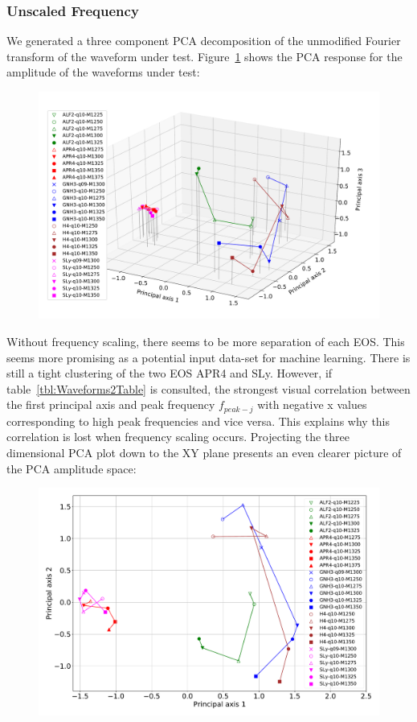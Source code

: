 \subsubsection{Unscaled Frequency}
\label{sec:PCAUnscaled}
We generated a three component PCA decomposition of the unmodified Fourier transform of the waveform under test. Figure~\ref{fig:PCAUnscaled3Damp} shows the PCA response for the amplitude of the waveforms under test: 
\begin{figure}[H]
	\centering
	\includegraphics[width=15cm]{./img/PCAUnscaled3Damp.pdf} 
	\caption[\protect]{\protect}
	\label{fig:PCAUnscaled3Damp}
\end{figure}
Without frequency scaling, there seems to be more separation of each EOS. This seems more promising as a potential input data-set for machine learning. There is still a tight clustering of the two EOS APR4 and SLy. However, if table~\ref{tbl:Waveforms2Table} is consulted, the strongest visual correlation between the first principal axis and peak frequency $f_{peak-j}$ with negative x values corresponding to high peak frequencies and vice versa.  This explains why this correlation is lost when frequency scaling occurs. Projecting the three dimensional PCA plot  down to the XY plane presents an even clearer picture of the PCA amplitude space:
\begin{figure}[H]
	\centering
	\includegraphics[width=15cm]{./img/PCAUnscaled2Damp.pdf} 
	\caption[\protect]{\protect}
	\label{fig:PCAUnscaled2Damp}
\end{figure}
